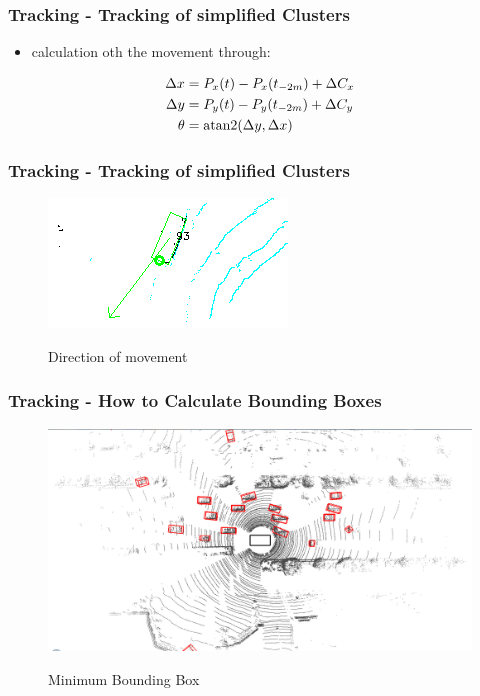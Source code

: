 \documentclass[nosymbols]{beamer}	%
\begin{document}
\begin{frame}
\frametitle{Tracking - Tracking of simplified Clusters}
\begin{itemize}
    \item calculation oth the movement through:
  \end{itemize}
  \begin{align*}
    \Delta x &= P_x(t) - P_x(t_{-2m}) + \Delta C_x\\
    \Delta y &= P_y(t) - P_y(t_{-2m}) + \Delta C_y\\
    \theta &= \operatorname{atan2}(\Delta y,\Delta x)
  \end{align*}
\end{frame}



\begin{frame}
\frametitle{Tracking - Tracking of simplified Clusters}
\begin{figure}[!ht]
\caption{Direction of movement}
\includegraphics[width=\textwidth,height=0.7\textheight,keepaspectratio]{bilder/obst_rot.png}
\label{segments}
\end{figure}
\end{frame}


\begin{frame}
\frametitle{Tracking - How to Calculate Bounding Boxes}
\begin{figure}[!ht]
\caption{Minimum Bounding Box}
\includegraphics[width=\textwidth,height=0.7\textheight,keepaspectratio]{bilder/min_bound_wrong.png}
\label{segments}
\end{figure}
\end{frame}
\end{document}
